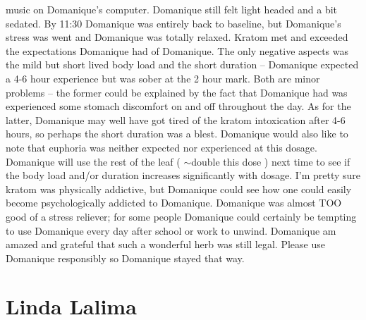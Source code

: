 \documentclass[12pt]{book}
\begin{document}
music on Domanique's computer. Domanique still felt light headed and a bit sedated. By 11:30 Domanique was entirely back to baseline, but Domanique's stress was went and Domanique was totally relaxed. Kratom met and exceeded the expectations Domanique had of Domanique. The only negative aspects was the mild but short lived body load and the short duration -- Domanique expected a 4-6 hour experience but was sober at the 2 hour mark. Both are minor problems -- the former could be explained by the fact that Domanique had was experienced some stomach discomfort on and off throughout the day. As for the latter, Domanique may well have got tired of the kratom intoxication after 4-6 hours, so perhaps the short duration was a blest. Domanique would also like to note that euphoria was neither expected nor experienced at this dosage. Domanique will use the rest of the leaf ( $\sim$double this dose ) next time to see if the body load and/or duration increases significantly with dosage. I'm pretty sure kratom was physically addictive, but Domanique could see how one could easily become psychologically addicted to Domanique. Domanique was almost TOO good of a stress reliever; for some people Domanique could certainly be tempting to use Domanique every day after school or work to unwind. Domanique am amazed and grateful that such a wonderful herb was still legal. Please use Domanique responsibly so Domanique stayed that way.



\chapter{Linda Lalima}
\end{document}

